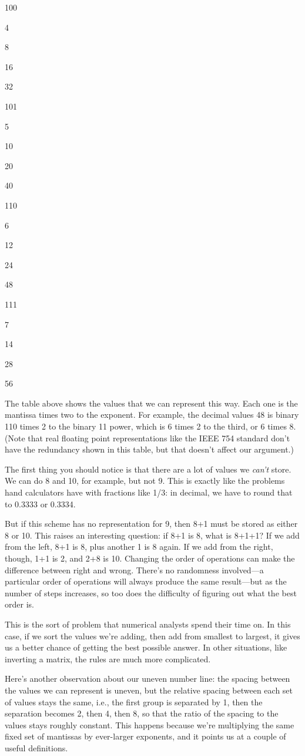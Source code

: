 \documentclass{book}
\begin{document}
100

4

8

16

32

101

5

10

20

40

110

6

12

24

48

111

7

14

28

56

The table above shows the values that we can represent this way. Each
one is the mantissa times two to the exponent. For example, the decimal
values 48 is binary 110 times 2 to the binary 11 power, which is 6 times
2 to the third, or 6 times 8. (Note that real floating point
representations like the IEEE 754 standard don't have the redundancy
shown in this table, but that doesn't affect our argument.)

The first thing you should notice is that there are a lot of values we
\emph{can't} store. We can do 8 and 10, for example, but not 9. This is
exactly like the problems hand calculators have with fractions like 1/3:
in decimal, we have to round that to 0.3333 or 0.3334.

But if this scheme has no representation for 9, then 8+1 must be stored
as either 8 or 10. This raises an interesting question: if 8+1 is 8,
what is 8+1+1? If we add from the left, 8+1 is 8, plus another 1 is 8
again. If we add from the right, though, 1+1 is 2, and 2+8 is 10.
Changing the order of operations can make the difference between right
and wrong. There's no randomness involved---a particular order of
operations will always produce the same result---but as the number of
steps increases, so too does the difficulty of figuring out what the
best order is.

This is the sort of problem that numerical analysts spend their time on.
In this case, if we sort the values we're adding, then add from smallest
to largest, it gives us a better chance of getting the best possible
answer. In other situations, like inverting a matrix, the rules are much
more complicated.

Here's another observation about our uneven number line: the spacing
between the values we can represent is uneven, but the relative spacing
between each set of values stays the same, i.e., the first group is
separated by 1, then the separation becomes 2, then 4, then 8, so that
the ratio of the spacing to the values stays roughly constant. This
happens because we're multiplying the same fixed set of mantissas by
ever-larger exponents, and it points us at a couple of useful
definitions.
\end{document}
